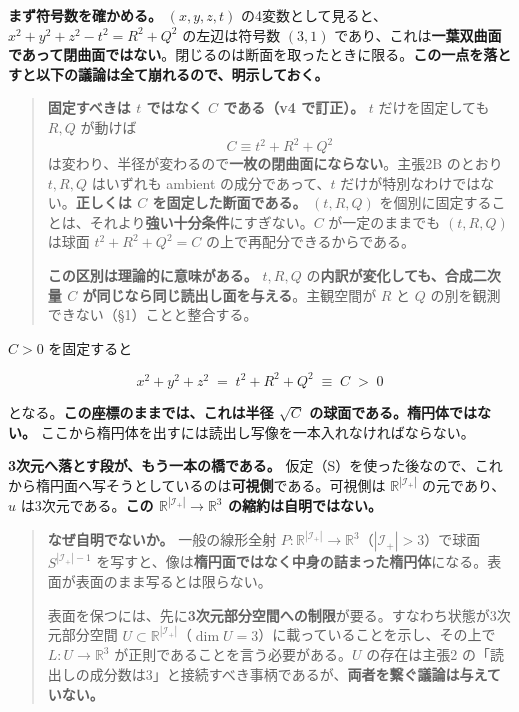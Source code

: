 \documentclass[
  10pt,
]{ltjsarticle}
\begin{document}
\textbf{まず符号数を確かめる。} \((x,y,z,t)\)
の4変数として見ると、\(x^2+y^2+z^2-t^2 = R^2+Q^2\) の左辺は符号数
\((3,1)\)
であり、これは\textbf{一葉双曲面であって閉曲面ではない}。閉じるのは断面を取ったときに限る。\textbf{この一点を落とすと以下の議論は全て崩れるので、明示しておく。}

\begin{quote}
\textbf{固定すべきは \(t\) ではなく \(C\) である（v4 で訂正）。} \(t\)
だけを固定しても \(R, Q\) が動けば \[C \equiv t^2+R^2+Q^2\]
は変わり、半径が変わるので\textbf{一枚の閉曲面にならない}。主張2B
のとおり \(t, R, Q\) はいずれも ambient の成分であって、\(t\)
だけが特別なわけではない。\textbf{正しくは \(C\) を固定した断面である。}
\((t,R,Q)\)
を個別に固定することは、それより\textbf{強い十分条件}にすぎない。\(C\)
が一定のままでも \((t,R,Q)\) は球面 \(t^2+R^2+Q^2=C\)
の上で再配分できるからである。

\textbf{この区別は理論的に意味がある。} \(t, R, Q\)
の\textbf{内訳が変化しても、合成二次量 \(C\)
が同じなら同じ読出し面を与える}。主観空間が \(R\) と \(Q\)
の別を観測できない（§1）ことと整合する。
\end{quote}

\(C > 0\) を固定すると

\[x^2 + y^2 + z^2 \;=\; t^2 + R^2 + Q^2 \;\equiv\; C \;>\; 0\]

となる。\textbf{この座標のままでは、これは半径 \(\sqrt{C}\)
の球面である。楕円体ではない。}
ここから楕円体を出すには読出し写像を一本入れなければならない。

\textbf{3次元へ落とす段が、もう一本の橋である。}
仮定（S）を使った後なので、これから楕円面へ写そうとしているのは\textbf{可視側}である。可視側は
\(\mathbb{R}^{|\mathcal{I}_+|}\) の元であり、\(u\)
は3次元である。\textbf{この
\(\mathbb{R}^{|\mathcal{I}_+|} \to \mathbb{R}^3\)
の縮約は自明ではない。}

\begin{quote}
\textbf{なぜ自明でないか。} 一般の線形全射
\(P : \mathbb{R}^{|\mathcal{I}_+|} \to \mathbb{R}^3\)（\(|\mathcal{I}_+| > 3\)）で球面
\(S^{|\mathcal{I}_+|-1}\)
を写すと、像は\textbf{楕円面ではなく中身の詰まった楕円体}になる。表面が表面のまま写るとは限らない。

表面を保つには、先に\textbf{3次元部分空間への制限}が要る。すなわち状態が3次元部分空間
\(U \subset \mathbb{R}^{|\mathcal{I}_+|}\)（\(\dim U = 3\)）に載っていることを示し、その上で
\(L : U \to \mathbb{R}^3\) が正則であることを言う必要がある。\(U\)
の存在は主張2
の「読出しの成分数は3」と接続すべき事柄であるが、\textbf{両者を繋ぐ議論は与えていない。}
\end{quote}
\end{document}
